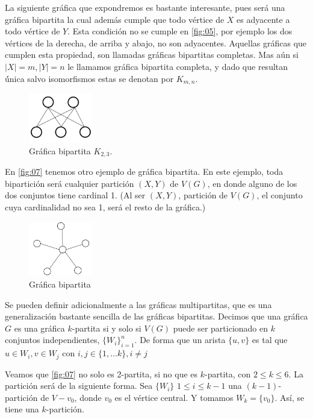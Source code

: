 La siguiente gráfica que expondremos es bastante interesante, pues será una
gráfica bipartita la cual además cumple que todo vértice de $X$ es adyacente a
todo vértice de $Y$. Esta condición no se cumple en \cref{fig:05}, por ejemplo
los dos vértices de la derecha, de arriba y abajo, no son adyacentes. Aquellas
gráficas que cumplen esta propiedad, son llamadas gráficas bipartitas completas.
Mas aún si $|X| = m, |Y| = n $ le llamamos gráfica bipartita completa, y dado
que resultan \'única salvo isomorfismos estas se denotan por $K_{m,n}$.


\begin{figure}[H]
  \centering
  \includegraphics[width=0.25\textwidth]{recursos/capturas/06.jpg}
  \caption{Gráfica bipartita $K_{2,3}$.}
  \label{fig:11}
\end{figure}

En \cref{fig:07} tenemos otro ejemplo de gráfica bipartita. En este ejemplo,
toda bipartición será cualquier partición $(X,Y)$ de $V(G)$, en donde alguno de
los dos conjuntos tiene cardinal 1. (Al ser $(X,Y)$, partición de $V(G)$, el
conjunto cuya cardinalidad no sea 1, será el resto de la gráfica.)

\begin{figure}[H]
  \centering
  \includegraphics[width=0.25\textwidth]{recursos/capturas/07.jpg}
  \caption{Gráfica bipartita}
  \label{fig:12}
\end{figure}

Se pueden definir adicionalmente a las gráficas multipartitas, que es una
generalización bastante sencilla de las gráficas bipartitas. Decimos que una
gráfica $G$ es una gráfica $k$-partita si y solo si $V(G)$ puede ser
particionado en $k$ conjuntos independientes, $\{W_i\}_{i=1}^n$. De forma que un
arista $\{u,v\}$ es tal que $u\in W_i, v\in W_j$ con $i,j\in \{1, \dots k\},
i\neq j$ 

Veamos que \cref{fig:07} no solo es 2-partita, si no que es $k$-partita, con
$2\leq k \leq 6$. La partición será de la siguiente forma. Sea $\{W_i\}$ $1\leq
i\leq k-1$ una $(k-1)$-partición de $V-v_0$, donde $v_0 $ es el vértice central.
Y tomamos $W_k=\{v_0\}$. Así, se tiene una $k$-partición.

